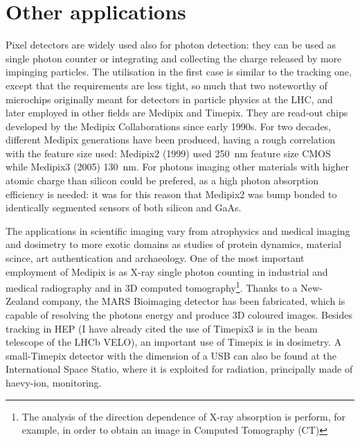 \section{Other applications}
    Pixel detectors are widely used also for photon detection: they can be used as single photon counter or integrating and collecting the charge released by more impinging particles. The utilisation in the first case is similar to the tracking one, except that the requirements are less tight, so much that two noteworthy of microchips originally meant for detectors in particle physics at the LHC, and later employed in other fields are Medipix and Timepix. They are read-out chips developed by the Medipix Collaborations since early 1990s. For two decades, different Medipix generations have been produced, having a rough correlation with the feature size used: Medipix2 (1999) used \SI{250}{nm} feature size CMOS while Medipix3 (2005) \SI{130}{nm}.
    For photons imaging other materials with higher atomic charge than silicon could be prefered, as a high photon absorption efficiency is needed: it was for this reason that Medipix2 was bump bonded to identically segmented sensors of both silicon and GaAs.
    
    The applications in scientific imaging vary from atrophysics and medical imaging and dosimetry to more exotic domains as studies of protein dynamics, material scince, art authentication and archaeology.
    One of the most important employment of Medipix is as X-ray single photon counting in industrial and medical radiography and in 3D computed tomography\footnote{The analysis of the direction dependence of X-ray absorption is perform, for example, in order to obtain an image in Computed Tomography (CT)}. Thanks to a New-Zealand company, the MARS Bioimaging detector has been fabricated, which is capable of resolving the photons energy and produce 3D coloured images.
    Besides tracking in HEP (I have already cited the use of Timepix3 is in the beam telescope of the LHCb VELO), an important use of Timepix is in dosimetry.
    A small-Timepix detector with the dimension of a USB can also be found at the International Space Statio, where it is exploited for radiation, principally made of haevy-ion, monitoring. 
 
